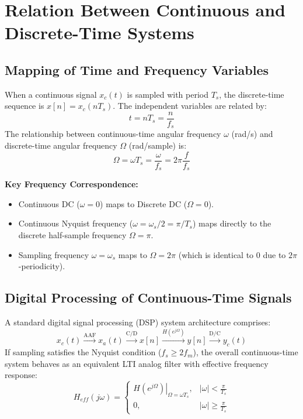 \documentclass[12pt,a4paper]{article}
\begin{document}
\section{Relation Between Continuous and Discrete-Time Systems}

\subsection{Mapping of Time and Frequency Variables}
When a continuous signal $x_c(t)$ is sampled with period $T_s$, the discrete-time sequence is $x[n] = x_c(n T_s)$. The independent variables are related by:
\begin{equation}
  t = n T_s = \frac{n}{f_s}
\end{equation}
The relationship between continuous-time angular frequency $\omega$ (rad/s) and discrete-time angular frequency $\Omega$ (rad/sample) is:
\begin{equation}
  \Omega = \omega T_s = \frac{\omega}{f_s} = 2\pi \frac{f}{f_s}
\end{equation}

\textbf{Key Frequency Correspondence:}
\begin{itemize}[topsep=2pt, itemsep=2pt]
  \item Continuous DC ($\omega = 0$) maps to Discrete DC ($\Omega = 0$).
  \item Continuous Nyquist frequency ($\omega = \omega_s / 2 = \pi / T_s$) maps directly to the discrete half-sample frequency $\Omega = \pi$.
  \item Sampling frequency $\omega = \omega_s$ maps to $\Omega = 2\pi$ (which is identical to $0$ due to $2\pi$-periodicity).
\end{itemize}

\subsection{Digital Processing of Continuous-Time Signals}
A standard digital signal processing (DSP) system architecture comprises:
\begin{equation*}
  x_c(t) \xrightarrow{\text{AAF}} x_a(t) \xrightarrow{\text{C/D}} x[n] \xrightarrow{\boxed{H(e^{j\Omega})}} y[n] \xrightarrow{\text{D/C}} y_c(t)
\end{equation*}
If sampling satisfies the Nyquist condition ($f_s \ge 2 f_m$), the overall continuous-time system behaves as an equivalent LTI analog filter with effective frequency response:
\begin{equation}
  H_{eff}(j\omega) = \begin{cases} \left. H(e^{j\Omega}) \right|_{\Omega = \omega T_s}, & |\omega| < \frac{\pi}{T_s} \\ 0, & |\omega| \ge \frac{\pi}{T_s} \end{cases}
\end{equation}
\end{document}
